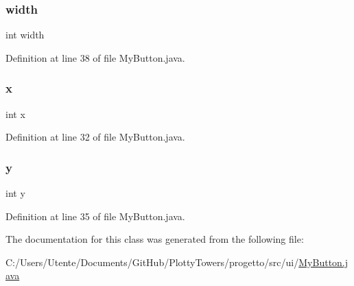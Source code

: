 \subsubsection{\texorpdfstring{width}{width}}
{\footnotesize\ttfamily int width\hspace{0.3cm}{\ttfamily [protected]}}



Definition at line 38 of file My\+Button.\+java.

\mbox{\label{classui_1_1_my_button_a6150e0515f7202e2fb518f7206ed97dc}} 
\subsubsection{\texorpdfstring{x}{x}}
{\footnotesize\ttfamily int x\hspace{0.3cm}{\ttfamily [protected]}}



Definition at line 32 of file My\+Button.\+java.

\mbox{\label{classui_1_1_my_button_a0a2f84ed7838f07779ae24c5a9086d33}} 
\subsubsection{\texorpdfstring{y}{y}}
{\footnotesize\ttfamily int y\hspace{0.3cm}{\ttfamily [protected]}}



Definition at line 35 of file My\+Button.\+java.



The documentation for this class was generated from the following file\+:\begin{DoxyCompactItemize}
\item 
C\+:/\+Users/\+Utente/\+Documents/\+Git\+Hub/\+Plotty\+Towers/progetto/src/ui/\hyperlink{_my_button_8java}{My\+Button.\+java}\end{DoxyCompactItemize}

